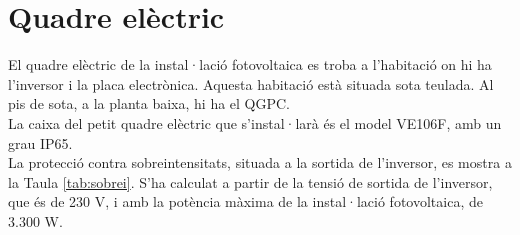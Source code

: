 
\section{Quadre elèctric}
El quadre elèctric de la instal·lació fotovoltaica es troba a l'habitació on hi ha l'inversor i la placa electrònica. Aquesta habitació està situada sota teulada. Al pis de sota, a la planta baixa, hi ha el QGPC.\\
\newline La caixa del petit quadre elèctric que s'instal·larà és el model VE106F, amb un grau IP65.\\
\newline La protecció contra sobreintensitats, situada a la sortida de l'inversor, es mostra a la Taula \ref{tab:sobrei}. S'ha calculat a partir de la tensió de sortida de l'inversor, que és de 230 V, i amb la potència màxima de la instal·lació fotovoltaica, de 3.300 W.

